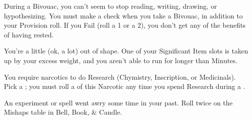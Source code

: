 {  

  During a Bivouac, you can't seem to stop reading, writing, drawing, or hypothesizing.  You must make a \RS \FOC check when you take a Bivouac, in addition to your Provision roll.  If you Fail (roll a 1 or a 2), you don't get any of the benefits of having rested.


  You're a little (ok, a lot) out of shape.  One of your Significant Item slots is taken up by your excess weight, and you aren't able to run for longer than Minutes.


  You require narcotics to do Research (Chymistry, Inscription, or Medicinals).  Pick a ; you must roll a \UD of this Narcotic any time you spend Research during a .



  An experiment or spell went awry some time in your past.  Roll twice on the Mishaps table in Bell, Book, \& Candle.

\newpage





\cbreak








}
